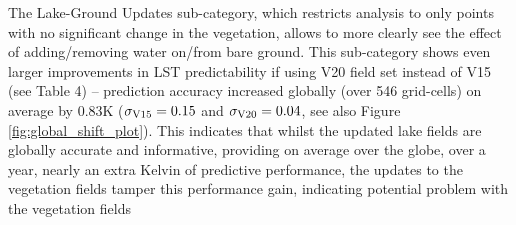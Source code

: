 \documentclass[hess, twostagejnl]{copernicus}
\begin{document}


\noindent The Lake-Ground Updates sub-category, which restricts analysis to only points with no significant change in the vegetation, allows to more clearly see the effect of adding/removing water on/from bare ground. This sub-category shows even larger improvements in LST predictability if using V20 field set instead of V15 (see Table 4) – prediction accuracy increased globally (over 546 grid-cells) on average by 0.83K ($\sigma_{\rm V15} = 0.15$ and $\sigma_{\rm V20}=0.04$, see also Figure \ref{fig:global_shift_plot}). This indicates that whilst the updated lake fields are globally accurate and informative, providing on average over the globe, over a year, nearly an extra Kelvin of predictive performance, the updates to the vegetation fields tamper this performance gain, indicating potential problem with the vegetation fields
\end{document}
